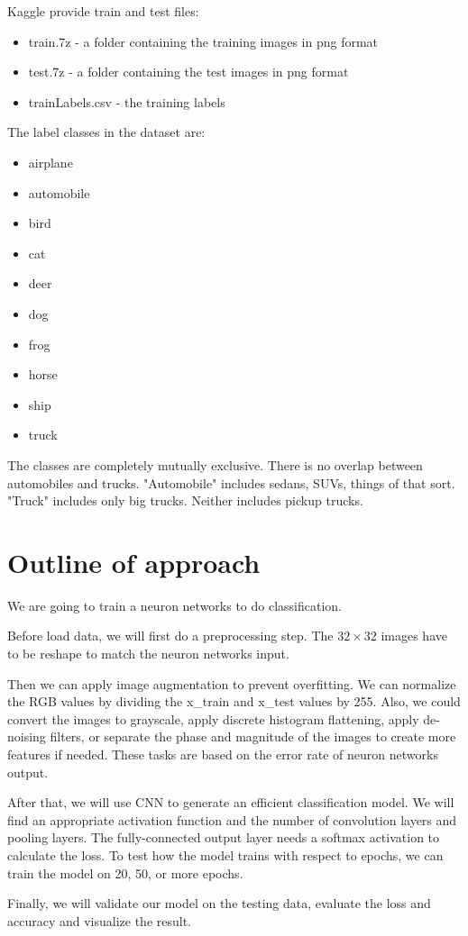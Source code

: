 \documentclass{article}
\begin{document}
Kaggle provide train and test files:
\begin{itemize}
    \item train.7z - a folder containing the training images in png format
    \item test.7z - a folder containing the test images in png format
    \item trainLabels.csv - the training labels
\end{itemize}

The label classes in the dataset are:
\begin{itemize}
    \item airplane 
    \item automobile 
    \item bird 
    \item cat 
    \item deer 
    \item dog 
    \item frog 
    \item horse 
    \item ship 
    \item truck
\end{itemize}

The classes are completely mutually exclusive. There is no overlap between automobiles and trucks. "Automobile" includes sedans, SUVs, things of that sort. "Truck" includes only big trucks. Neither includes pickup trucks.

\section{Outline of approach}
\hspace{1.5em}We are going to train a neuron networks to do classification.

Before load data, we will first do a preprocessing step. The $32\times32$ images have to be reshape to match the neuron networks input.

Then we can apply image augmentation to prevent overfitting. We can normalize the RGB values by dividing the x\_train and x\_test values by 255.
Also, we could convert the images to grayscale, apply discrete histogram flattening, apply de-noising filters, or separate the phase and magnitude of the images to create more features if needed. These tasks are based on the error rate of neuron networks output.

After that, we will use CNN to generate an efficient classification model. We will find an appropriate activation function and the number of convolution layers and pooling layers.
The fully-connected output layer needs a softmax activation to calculate the loss. To test how the model trains with respect to epochs, we can train the model on 20, 50, or more epochs.

Finally, we will validate our model on the testing data, evaluate the loss and accuracy and visualize the result.
\end{document}
